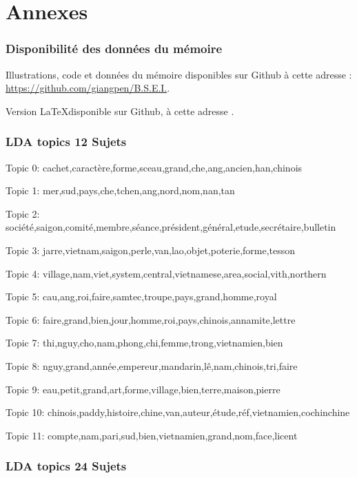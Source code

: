 \appendix
\part*{Annexes}
\pagestyle{myheadings}

\section{Disponibilité des données du mémoire}\label{code}

Illustrations, code et données du mémoire disponibles sur Github à cette adresse : \url{https://github.com/giangpen/B.S.E.I.}. 

Version \LaTeX disponible sur Github, à cette adresse \url{}.

\newpage
\section{LDA topics 12 Sujets}

Topic 0: cachet,caractère,forme,sceau,grand,che,ang,ancien,han,chinois

Topic 1: mer,sud,pays,che,tchen,ang,nord,nom,nan,tan

Topic 2: société,saigon,comité,membre,séance,président,général,etude,secrétaire,bulletin

Topic 3: jarre,vietnam,saigon,perle,van,lao,objet,poterie,forme,tesson

Topic 4: village,nam,viet,system,central,vietnamese,area,social,vith,northern

Topic 5: cau,ang,roi,faire,samtec,troupe,pays,grand,homme,royal

Topic 6: faire,grand,bien,jour,homme,roi,pays,chinois,annamite,lettre

Topic 7: thi,nguy,cho,nam,phong,chi,femme,trong,vietnamien,bien

Topic 8: nguy,grand,année,empereur,mandarin,lê,nam,chinois,tri,faire

Topic 9: eau,petit,grand,art,forme,village,bien,terre,maison,pierre

Topic 10: chinois,paddy,histoire,chine,van,auteur,étude,réf,vietnamien,cochinchine

Topic 11: compte,nam,pari,sud,bien,vietnamien,grand,nom,face,licent


\newpage 
\section{LDA topics 24 Sujets}

